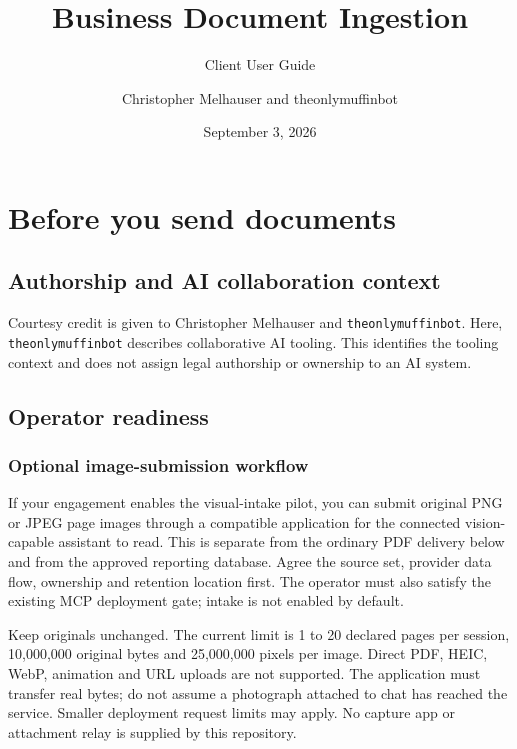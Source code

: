 \documentclass[
]{article}
\title{Business Document Ingestion}
\subtitle{Client User Guide}
\author{Christopher Melhauser and theonlymuffinbot}
\date{September 3, 2026}
\begin{document}
\maketitle

\section{Before you send documents}\label{before-you-send-documents}

\subsection{Authorship and AI collaboration
context}\label{authorship-and-ai-collaboration-context}

Courtesy credit is given to Christopher Melhauser and
\texttt{theonlymuffinbot}. Here, \texttt{theonlymuffinbot} describes
collaborative AI tooling. This identifies the tooling context and does
not assign legal authorship or ownership to an AI system.

\subsection{Operator readiness}\label{operator-readiness}

\subsubsection{Optional image-submission
workflow}\label{optional-image-submission-workflow}

If your engagement enables the visual-intake pilot, you can submit
original PNG or JPEG page images through a compatible application for
the connected vision-capable assistant to read. This is separate from
the ordinary PDF delivery below and from the approved reporting
database. Agree the source set, provider data flow, ownership and
retention location first. The operator must also satisfy the existing
MCP deployment gate; intake is not enabled by default.

Keep originals unchanged. The current limit is 1 to 20 declared pages
per session, 10,000,000 original bytes and 25,000,000 pixels per image.
Direct PDF, HEIC, WebP, animation and URL uploads are not supported. The
application must transfer real bytes; do not assume a photograph
attached to chat has reached the service. Smaller deployment request
limits may apply. No capture app or attachment relay is supplied by this
repository.
\end{document}
